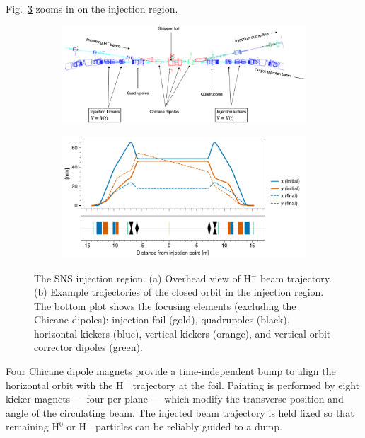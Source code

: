 Fig.~\ref{fig:SNS_injection_region} zooms in on the injection region.
%
\begin{figure}[!p]
    \centering
    \begin{subfigure}{\textwidth}
        \includegraphics[width=\textwidth]{Images/chapter1/SNS_injection_region1.png}
        \label{fig:SNS_injection_region_a}
        \caption{}
    \end{subfigure}
    \vfill
    \vspace*{0.5cm}
    \vfill
    \begin{subfigure}{\textwidth}
        \centering
        \includegraphics[width=\textwidth]{Images/chapter1/inj_region_elements.pdf}
        \caption{}
        \label{fig:SNS_injection_region_b}
    \end{subfigure}
    \caption{The SNS injection region. (a) Overhead view of H$^-$ beam trajectory. (b) Example trajectories of the closed orbit in the injection region. The bottom plot shows the focusing elements (excluding the Chicane dipoles): injection foil (gold), quadrupoles (black), horizontal kickers (blue), vertical kickers (orange), and vertical orbit corrector dipoles (green).}
    \label{fig:SNS_injection_region}
\end{figure}
%
Four Chicane dipole magnets provide a time-independent bump to align the horizontal orbit with the H$^-$ trajectory at the foil. Painting is performed by eight kicker magnets — four per plane — which modify the transverse position and angle of the circulating beam. The injected beam trajectory is held fixed so that remaining H$^0$ or H$^-$ particles can be reliably guided to a dump.


